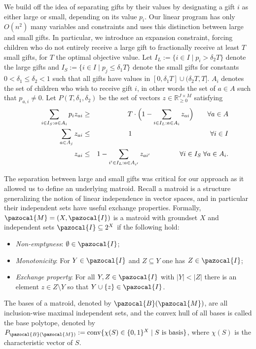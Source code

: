 We build off the idea of separating gifts by their values by designating a gift $i$ as either large or small, depending on its value $p_i$. 
Our linear program has only $O(n^2)$ many variables and constraints and uses this distinction between large and small gifts. 
In particular, we introduce an expansion constraint, 
forcing children who do not entirely receive a large gift to fractionally receive at least $T$ small gifts, 
for $T$ the optimal objective value. Let
$I_L := \{ i \in I \mid p_i > \delta_2 T\}$ denote the large gifts
and $I_S := \{ i \in I \mid p_j \leq \delta_1 T\}$ denote the small gifts
for constants $0 < \delta_1 \leq \delta_2 < 1$ such that
all gifts have values in $[0,\delta_1  T] \cup (\delta_2  T,T]$. 
$A_i$ denotes the set of children who wish to receive gift $i$, in other words the set of $a \in A$ such that $p_{a,i} \neq 0$.
Let $P(T,\delta_1,\delta_2)$ be the set of vectors $z \in \mathbb{R}_{\geq 0}^{J \times M}$ satisfying
\begin{eqnarray*}\label{eq:CompactLPforSC} \qquad
        \sum\limits_{i \in I_S: a \in A_i} p_i z_{ai} &\geq& T \cdot \Big( 1-\sum_{i \in I_L: a \in A_i} z_{ai}\Big)  \qquad \forall a \in A \\
        \sum\limits_{a \in A_j}z_{ai} &\leq& 1 \hspace{4.0cm} \forall i \in I \\
        z_{ai} &\leq& 1-\sum_{i' \in I_L: a \in A_{i'}} z_{ai'} \hspace{1.5cm} \forall i \in I_S \; \forall a \in A_i.
\end{eqnarray*}


The separation between large and small gifts was critical for our approach as it allowed us to define an underlying matroid.
Recall a matroid is a structure generalizing the notion of linear independence in vector spaces,
and in particular their independent sets have useful exchange properties. 
Formally, $\pazocal{M} = (X,\pazocal{I})$ is a matroid with groundset $X$ and 
independent sets $\pazocal{I} \subseteq 2^X$ if the following hold:
\begin{itemize}
\item \emph{Non-emptyness}: $\emptyset \in \pazocal{I}$; 
\item \emph{Monotonicity}: For $Y \in \pazocal{I}$ and $Z \subseteq Y$ one has $Z \in \pazocal{I}$; 
\item \emph{Exchange property}: For all $Y,Z \in \pazocal{I}$ with $|Y| < |Z|$ there is an element $z \in Z \setminus Y$ so that $Y \cup \{ z\} \in \pazocal{I}$.
\end{itemize}
The bases of a matroid, denoted by $\pazocal{B}(\pazocal{M})$, are all inclusion-wise maximal independent sets, and
the convex hull of all bases is called the base polytope, denoted by $P_{\pazocal{B}(\pazocal{M})} := \text{conv}\{ \chi(S) \in \{0,1\}^X \mid S\text{ is basis}\}$,
where $\chi(S)$ is the characteristic vector of $S$.


